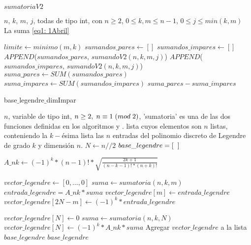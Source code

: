 \begin{algorithm}
\caption{$sumatoriaV2$}\label{alg: sumatoriaV2}
\begin{algorithmic} [1]
\REQUIRE $n$, $k$, $m$, $j$, todas de tipo int, con $n \geq 2$, 
$0 \leq k, m \leq n-1$, $0 \leq j \leq min(k,m)$
\ENSURE La suma \eqref{eq1: 1Abril}

\STATE $limite \leftarrow minimo(m,k)$
\STATE $sumandos\_pares \leftarrow []$
\STATE $sumandos\_impares \leftarrow []$
\STATE $APPEND$($sumandos\_pares$, $sumandoV2(n,k,m,j)$)
\ENDFOR
{} 
\STATE $APPEND$($sumandos\_impares$, $sumandoV2(n,k,m,j)$)
\ENDFOR
\STATE $suma\_pares \leftarrow SUM(sumandos\_pares)$
\STATE $suma\_impares \leftarrow SUM(sumandos\_impares)$
\RETURN $suma\_pares - suma\_impares$
\end{algorithmic}
\end{algorithm}



\begin{algorithm}
\caption{base$\_$legendre$\_$dimImpar}\label{alg: legendre impar}
\begin{algorithmic}[1] 
\REQUIRE $n$, variable de tipo int, $n \geq 2, \hspace{0.1cm} n \equiv 1 \hspace{0.1cm} (mod \hspace{0.1cm} 2)$, 'sumatoria' es una de las dos funciones definidas en los algoritmos
 y .
\ENSURE lista cuyos elementos son $n$ listas, conteniendo
la $k-$ésima lista las $n$ entradas del polinomio discreto de Legendre de
grado $k$ y dimensión $n$.
\STATE $N \leftarrow n//2$
\STATE $base\_legendre=[ \hspace{0.2cm} ]$ 

\STATE $A\_nk \leftarrow (-1)^{k}*(n-1)!*
\sqrt{\frac{
2k+1
}{
(n-k-1)!*(n+k)!
}}$

\STATE $vector\_legendre \leftarrow [ 0, \ldots , 0]$  
\STATE $suma \leftarrow sumatoria(n,k,m)$
\STATE $entrada\_legendre=A\_nk * suma$
\STATE $vector\_legendre[m] \leftarrow entrada\_legendre$ 
\STATE $vector\_legendre[2N-m] \leftarrow (-1)^{k}*entrada\_legendre$ 
\ENDFOR

\STATE $vector\_legendre[N] \leftarrow 0$
\ELSE
\STATE $suma \leftarrow sumatoria(n,k,N)$
\STATE $vector\_legendre[N] \leftarrow (-1)^{k}*A\_nk * suma$
\ENDIF
\STATE Agregar $vector\_legendre$ a la lista $base\_legendre$
\ENDFOR
\RETURN $base\_legendre$
\end{algorithmic}
\end{algorithm}




